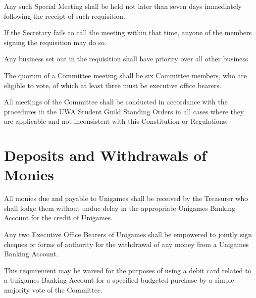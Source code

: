 \documentclass[a4paper]{article}
\begin{document}
\begin{myEnumerate}
        \begin{myEnumerate}
            \item Any such Special Meeting shall be held not later than seven days immediately following the receipt of such requisition.
                \begin{myEnumerate}
                    \item If the Secretary fails to call the meeting within that time, anyone of the members signing the requisition may do so.
                \end{myEnumerate}
            \item Any business set out in the requisition shall have priority over all other business
        \end{myEnumerate}
    \item The quorum of a Committee meeting shall be six Committee members, who are eligible to vote, of which at least three must be executive office bearers.
    \item All meetings of the Committee shall be conducted in accordance with the procedures in the UWA Student Guild Standing Orders in all cases where they are applicable and not inconsistent with this Constitution or Regulations.
\end{myEnumerate}


\section{Deposits and Withdrawals of Monies} \label{sec:monies}
\begin{myEnumerate}
    \item All monies due and payable to Unigames shall be received by the Treasurer who shall lodge them without undue delay in the appropriate Unigames Banking Account for the credit of Unigames.
    \item Any two Executive Office Bearers of Unigames shall be empowered to jointly sign cheques or forms of authority for the withdrawal of any money from a Unigames Banking Account.
        \begin{myEnumerate}
            \item This requirement may be waived for the purposes of using a debit card related to a Unigames Banking Account for a specified budgeted purchase by a simple majority vote of the Committee.
        \end{myEnumerate}
\end{myEnumerate}
\end{document}
